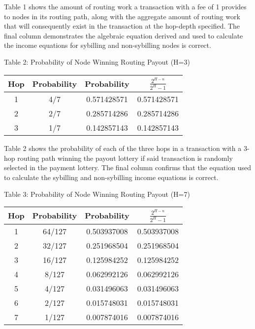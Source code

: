 \documentclass[oneside]{article}   	%
\begin{document}
\bigskip

Table 1 shows the amount of routing work a transaction with a fee of 1 provides to nodes in its routing path, along with the aggregate amount of routing work that will consequently exist in the transaction at the hop-depth specified. The final column demonstrates the algebraic equation derived and used to calculate the income equations for sybilling and non-sybilling nodes is correct.

\pagebreak


\begin{center}
Table 2: Probability of Node Winning Routing Payout (H=3)
\bigskip
\begin{tabular}{ |c|c|c|c| } 
 \hline
 Hop & Probability & Probability & \begin{math}\frac{2^{H - n}}{2^H - 1}\end{math} \\
 \hline
1 & 
4/7 & 
0.571428571 & 
0.571428571 \\
2 & 
2/7 & 
0.285714286 & 
0.285714286 \\
3 & 
1/7 & 
0.142857143 & 
0.142857143 \\
 \hline
\end{tabular}
\end{center}

\bigskip

Table 2 shows the probability of each of the three hops in a transaction with a 3-hop routing path winning the payout lottery if said transaction is randomly selected in the payment lottery. The final column confirms that the equation used to calculate the sybilling and non-sybilling income equations is correct.


\pagebreak


\begin{center}
Table 3: Probability of Node Winning Routing Payout (H=7)
\bigskip
\begin{tabular}{ |c|c|c|c| } 
 \hline
 Hop & Probability & Probability & \begin{math}\frac{2^{H - n}}{2^H - 1}\end{math} \\
 \hline
1 & 
64/127 & 
0.503937008 & 
0.503937008 \\
2 & 
32/127 & 
0.251968504 & 
0.251968504 \\
3 & 
16/127 & 
0.125984252 & 
0.125984252 \\
4 & 
8/127 & 
0.062992126 & 
0.062992126 \\
5 & 
4/127 & 
0.031496063 & 
0.031496063 \\
6 & 
2/127 & 
0.015748031 & 
0.015748031 \\
7 & 
1/127 & 
0.007874016 & 
0.007874016 \\
 \hline
\end{tabular}
\end{center}
\end{document}
